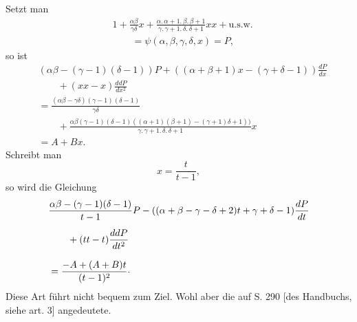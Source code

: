 \noindent{\small[S. 291]}\par
\noindent\hspace*{\parindent}Setzt man
\[
\begin{aligned}
&1+\frac{\alpha\beta}{\gamma\delta}x+\frac{\alpha{.}\,\alpha+1{.}\,\beta{.}\,\beta+1}{\gamma{.}\,\gamma+1{.}\,\delta{.}\,\delta+1}xx+\text{u.s.w.}\\[.4em]
&\qquad=\psi(\alpha,\beta,\gamma,\delta,x)=P,
\end{aligned}
\]
\noindent so ist
\[
\begin{aligned}
&(\alpha\beta-(\gamma-1)(\delta-1))P+((\alpha+\beta+1)x-(\gamma+\delta-1))\frac{dP}{dx}\\[.5em]
&\qquad+(xx-x)\frac{ddP}{dx^2}\\[.8em]
&=\frac{(\alpha\beta-\gamma\delta)(\gamma-1)(\delta-1)}{\gamma\delta}\\[.5em]
&\qquad+\frac{\alpha\beta(\gamma-1)(\delta-1)((\alpha+1)(\beta+1)-(\gamma+1)\delta+1))}{\gamma{.}\,\gamma+1{.}\,\delta{.}\,\delta+1}x\\[.8em]
&=A+Bx.
\end{aligned}
\]
\noindent Schreibt man
\[
x=\frac{t}{t-1},
\]
\noindent so wird die Gleichung
\[
\begin{aligned}
&\frac{\alpha\beta-(\gamma-1)(\delta-1)}{t-1}P-((\alpha+\beta-\gamma-\delta+2)t+\gamma+\delta-1)\frac{dP}{dt}\\[.5em]
&\qquad+(tt-t)\frac{ddP}{dt^2}\\[.8em]
&=\frac{-A+(A+B)t}{(t-1)^2}\mathpunct{\raisebox{.35ex}{.}}
\end{aligned}
\]
\noindent Diese Art führt nicht bequem zum Ziel. Wohl aber die auf S. 290 [des Handbuchs, siehe art. 3] angedeutete.
\clearpage
